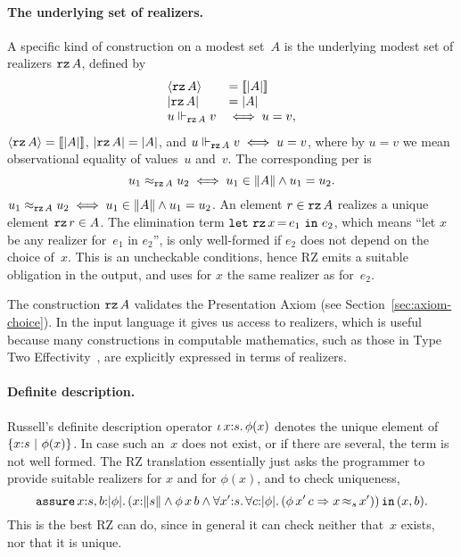 \paragraph{The underlying set of realizers.}
%
A specific kind of construction on a modest set~$A$ is the underlying
modest set of realizers $\texttt{rz}\,A$, defined by
%
\iflong
\[
\begin{array}{ll}
  \langle \texttt{rz}\,A \rangle &= [\![|A|]\!] \\
  |\texttt{rz}\,A| &= |A| \\
  u \Vdash_{\texttt{rz}\,A} v &\iff u = v,
\end{array}
\]
\else  %
$\langle \texttt{rz}\,A \rangle = [\![|A|]\!]$,  
$|\texttt{rz}\,A| = |A|$, and 
$u \Vdash_{\texttt{rz}\,A} v \iff u = v$, 
\fi %
%
where by $u = v$ we mean observational equality of values~$u$ and~$v$.
The corresponding per is
%
\iflong
\begin{equation*}
  u_1 \approx_{\texttt{rz}\,A} u_2 \iff u_1 \in \|A\| \land u_1 = u_2.
\end{equation*}
\else
$u_1 \approx_{\texttt{rz}\,A} u_2 \iff u_1 \in \|A\| \land u_1 = u_2$.
%
An element $r \in \texttt{rz}\,A$ realizes a unique element $\texttt{rz}\,r \in A$.
The elimination term $\texttt{let}\ \texttt{rz}\,x\,{=}\,e_1\ \texttt{in}\ e_2$, which means ``let $x$ be
any realizer for~$e_1$ in $e_2$'', is only well-formed if $e_2$ does
not depend on the choice of~$x$. This is an uncheckable conditions,
hence RZ emits a suitable obligation in the output, and uses for $x$
the same realizer as for~$e_2$.

The construction $\texttt{rz}\,A$ validates the Presentation Axiom (see
Section~\ref{sec:axiom-choice}). In the input language it gives us
access to realizers, which is useful because many constructions in
computable mathematics, such as those in Type Two
Effectivity~\cite{Wei00}, are explicitly expressed in terms of
realizers.

\iflong
\paragraph{Definite description.}
%
Russell's definite description operator $\iota\,x{:}s{.}\, \phi(x)$ denotes
the unique element of $\{x{:}s\ |\ \phi(x)\}$. In case such an~$x$
does not exist, or if there are several, the term is not well formed.
The RZ translation essentially just asks the programmer to provide
suitable realizers for $x$ and for $\phi(x)$, and to check uniqueness,
%
\begin{equation*}
  \ooblig{x{:}s,b}{\typeOf{\phi}}{
    (\ototal{x}{s} \land \oapp{\oapp{\phi}{x}}{b} \land
    \oforall{x'}{s}{
      \oforall{c}{\typeOf{\phi}}{
        (\oimply{\oapp{\oapp{\phi}{x'}}{c}}{\oper{s}{x}{x'}})
      }
    })
    }{(x,b)}.
\end{equation*}
%
This is the best RZ can do, since in general it can check neither
that~$x$ exists, nor that it is unique.
\fi

